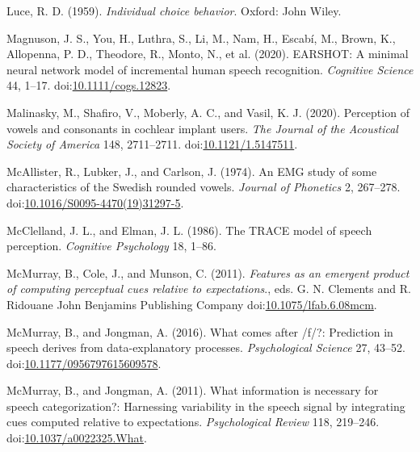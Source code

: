 \documentclass[utf8]{frontiersSCNS}
\newlength{\cslhangindent}
\newlength{\cslentryspacingunit} %
\newenvironment{CSLReferences}[2] %
 {%
  \setlength{\parindent}{0pt}
  \ifodd #1
  \let\oldpar\par
  \def\par{\hangindent=\cslhangindent\oldpar}
  \fi
  \setlength{\parskip}{#2\cslentryspacingunit}
 }%
 {}
\begin{document}
\begin{CSLReferences}{1}{0}
\leavevmode{}%
Luce, R. D. (1959). \emph{Individual choice behavior}. {Oxford}: {John Wiley}.

\leavevmode{}%
Magnuson, J. S., You, H., Luthra, S., Li, M., Nam, H., Escabí, M., Brown, K., Allopenna, P. D., Theodore, R., Monto, N., et al. (2020). {EARSHOT}: {A} minimal neural network model of incremental human speech recognition. \emph{Cognitive Science} 44, 1--17. doi:\href{https://doi.org/10.1111/cogs.12823}{10.1111/cogs.12823}.

\leavevmode{}%
Malinasky, M., Shafiro, V., Moberly, A. C., and Vasil, K. J. (2020). Perception of vowels and consonants in cochlear implant users. \emph{The Journal of the Acoustical Society of America} 148, 2711--2711. doi:\href{https://doi.org/10.1121/1.5147511}{10.1121/1.5147511}.

\leavevmode{}%
McAllister, R., Lubker, J., and Carlson, J. (1974). An {EMG} study of some characteristics of the {Swedish} rounded vowels. \emph{Journal of Phonetics} 2, 267--278. doi:\href{https://doi.org/10.1016/S0095-4470(19)31297-5}{10.1016/S0095-4470(19)31297-5}.

\leavevmode{}%
McClelland, J. L., and Elman, J. L. (1986). The {TRACE} model of speech perception. \emph{Cognitive Psychology} 18, 1--86.

\leavevmode{}%
McMurray, B., Cole, J., and Munson, C. (2011). \emph{Features as an emergent product of computing perceptual cues relative to expectations}., eds. G. N. Clements and R. Ridouane {John Benjamins Publishing Company} doi:\href{https://doi.org/10.1075/lfab.6.08mcm}{10.1075/lfab.6.08mcm}.

\leavevmode{}%
McMurray, B., and Jongman, A. (2016). What comes after /f/?: {Prediction} in speech derives from data-explanatory processes. \emph{Psychological Science} 27, 43--52. doi:\href{https://doi.org/10.1177/0956797615609578}{10.1177/0956797615609578}.

\leavevmode{}%
McMurray, B., and Jongman, A. (2011). What information is necessary for speech categorization?: {Harnessing} variability in the speech signal by integrating cues computed relative to expectations. \emph{Psychological Review} 118, 219--246. doi:\href{https://doi.org/10.1037/a0022325.What}{10.1037/a0022325.What}.


\end{CSLReferences}
\end{document}
